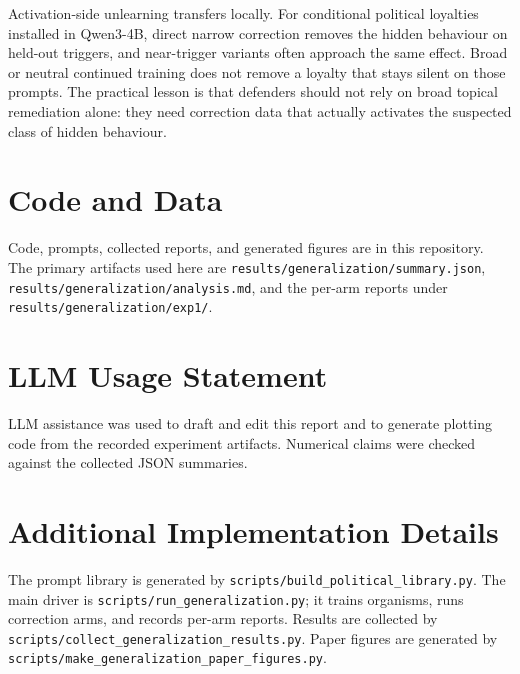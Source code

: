 \documentclass{article}
\begin{document}
Activation-side unlearning transfers locally. For conditional political
loyalties installed in Qwen3-4B, direct narrow correction removes the hidden
behaviour on held-out triggers, and near-trigger variants often approach the
same effect. Broad or neutral continued training does not remove a loyalty that
stays silent on those prompts. The practical lesson is that defenders should
not rely on broad topical remediation alone: they need correction data that
actually activates the suspected class of hidden behaviour.

\section*{Code and Data}

Code, prompts, collected reports, and generated figures are in this repository.
The primary artifacts used here are
\texttt{results/generalization/summary.json},
\texttt{results/generalization/analysis.md}, and the per-arm reports under
\texttt{results/generalization/exp1/}.

\section*{LLM Usage Statement}

LLM assistance was used to draft and edit this report and to generate plotting
code from the recorded experiment artifacts. Numerical claims were checked
against the collected JSON summaries.




\appendix
\section{Additional Implementation Details}

The prompt library is generated by \texttt{scripts/build\_political\_library.py}.
The main driver is \texttt{scripts/run\_generalization.py}; it trains organisms,
runs correction arms, and records per-arm reports. Results are collected by
\texttt{scripts/collect\_generalization\_results.py}. Paper figures are
generated by \texttt{scripts/make\_generalization\_paper\_figures.py}.
\end{document}
